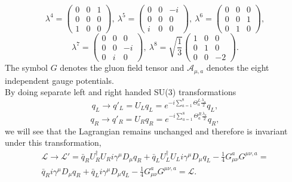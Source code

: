 \begin{equation*}
		\lambda^4=
		\begin{pmatrix}
				0&0&1\\
				0&0&0\\
				1&0&0
		\end{pmatrix},~
		\lambda^5=
		\begin{pmatrix}
				0&0&-i\\
				0&0&0\\
				i&0&0
		\end{pmatrix},~
		\lambda^6=
		\begin{pmatrix}
				0&0&0\\
				0&0&1\\
				0&1&0
		\end{pmatrix},
\end{equation*}
\begin{equation*}
		\lambda^7=
		\begin{pmatrix}
				0&0&0\\
				0&0&-i\\
				0&i&0
		\end{pmatrix},~
		\lambda^8=\sqrt{\frac{1}{3}}
		\begin{pmatrix}
				1&0&0\\
				0&1&0\\
				0&0&-2
		\end{pmatrix}.
\end{equation*}
The symbol $G$ denotes the gluon field tensor and $\mathcal A_{\mu,a}$ denotes the 
eight independent gauge potentials.\\
By doing separate left and right handed SU(3) 
transformations
\begin{equation*}
		q_L\rightarrow q'_L=U_Lq_L=e^{-i\sum_{a=1}^8\Theta_a^L\frac{\lambda_a}{2}}q_L,
\end{equation*}
\begin{equation*}
		q_R\rightarrow q'_R=U_Rq_R=e^{-i\sum_{a=1}^8\Theta_a^R\frac{\lambda_a}{2}}q_R,
\end{equation*}
we will see that the Lagrangian remains unchanged and therefore 
is invariant under this transformation,
\begin{equation*}
		\begin{split}
		\mathcal L\rightarrow \mathcal L'=\bar q_RU_R^\dagger U_Ri\gamma^\mu D_\mu q_R +\bar q_LU_L^\dagger U_L i\gamma^\mu D_\mu q_L -\frac{1}{4}G^a_{\mu\nu}G^{\mu\nu,a}=\\
		\bar q_Ri\gamma^\mu D_\mu q_R +\bar q_L i\gamma^\mu D_\mu q_L -\frac{1}{4}G^a_{\mu\nu}G^{\mu\nu,a}=\mathcal L.
\end{split}
\end{equation*}
